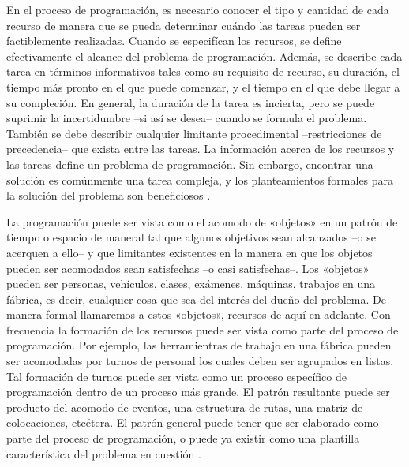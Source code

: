 \documentclass[draft,12pt,headsepline,footsepline,paper=letter]{scrreprt}
\begin{document}
En el proceso de programación, es necesario conocer el tipo y cantidad de cada recurso de manera que se pueda determinar cuándo las tareas pueden ser factiblemente realizadas. Cuando se especifícan los recursos, se define efectivamente el alcance del problema de programación. Además, se describe cada tarea en términos informativos tales como su requisito de recurso, su duración, el tiempo más pronto en el que puede comenzar, y el tiempo en el que debe llegar a su compleción. En general, la duración de la tarea es incierta, pero se puede suprimir la incertidumbre –si así se desea– cuando se formula el problema. También se debe describir cualquier limitante procedimental –restricciones de precedencia– que exista entre las tareas. La información acerca de los recursos y las tareas define un problema de programación. Sin embargo, encontrar una solución es comúnmente una tarea compleja, y los planteamientos formales para la solución del problema son beneficiosos \citep[p.~2]{Baker2009}.

La programación puede ser vista como el acomodo de «objetos» en un patrón de tiempo o espacio de maneral tal que algunos objetivos sean alcanzados –o se acerquen a ello– y que limitantes existentes en la manera en que los objetos pueden ser acomodados sean satisfechas –o casi satisfechas–. Los «objetos» pueden ser personas, vehículos, clases, exámenes, máquinas, trabajos en una fábrica, es decir, cualquier cosa que sea del interés del dueño del problema. De manera formal llamaremos a estos «objetos», recursos de aquí en adelante. Con frecuencia la formación de los recursos puede ser vista como parte del proceso de programación. Por ejemplo, las herramientras de trabajo en una fábrica pueden ser acomodadas por turnos de personal los cuales deben ser agrupados en listas. Tal formación de turnos puede ser vista como un proceso específico de programación dentro de un proceso más grande. El patrón resultante puede ser producto del acomodo de eventos, una estructura de rutas, una matriz de colocaciones, etcétera. El patrón general puede tener que ser elaborado como parte del proceso de programación, o puede ya existir como una plantilla característica del problema en cuestión \citep[p.~48]{wren95scheduling-timetabling}.
\end{document}
